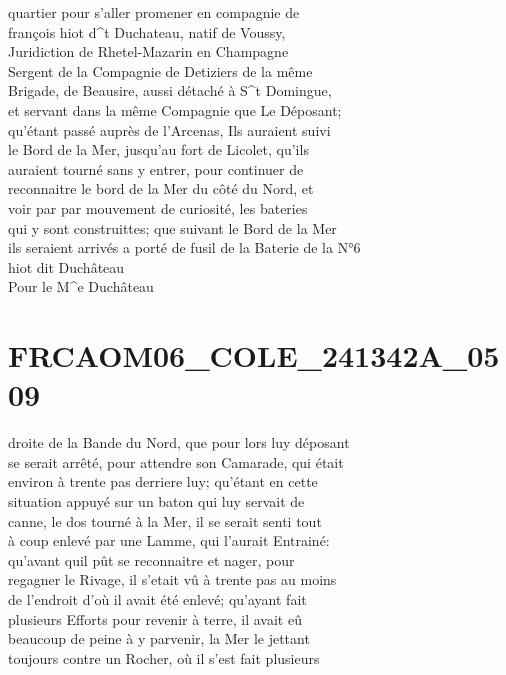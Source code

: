\documentclass{article}
\begin{document}
\begin{pages}
quartier pour s'aller promener en compagnie de\\
françois hiot d\^{}t Duchateau, natif de Voussy,\\
Juridiction de Rhetel-Mazarin en Champagne\\
Sergent de la Compagnie de Detiziers de la même\\
Brigade, de Beausire, aussi détaché à S\^{}t Domingue,\\
et servant dans la même Compagnie que Le Déposant;\\
qu'étant passé auprès de l'Arcenas, Ils auraient suivi\\
le Bord de la Mer, jusqu'au fort de Licolet, qu'ils\\
auraient tourné sans y entrer, pour continuer de\\
reconnaitre le bord de la Mer du côté du Nord, et\\
voir par par mouvement de curiosité, les bateries\\
qui y sont construittes; que suivant le Bord de la Mer\\
ils seraient arrivés a porté de fusil de la Baterie de la
\pend\pstart
N°6\\
hiot dit Duchâteau\\
Pour le M\^{}e Duchâteau
\pend
\endnumbering\beginnumbering\section{FRCAOM06\_COLE\_241342A\_0509}\pstart
droite de la Bande du Nord, que pour lors luy déposant\\
se serait arrêté, pour attendre son Camarade, qui était\\
environ à trente pas derriere luy; qu'étant en cette\\
situation appuyé sur un baton qui luy servait de\\
canne, le dos tourné à la Mer, il se serait senti tout\\
à coup enlevé par une Lamme, qui l'aurait Entrainé:\\
qu'avant quil pût se reconnaitre et nager, pour\\
regagner le Rivage, il s'etait vû à trente pas au moins\\
de l'endroit d'où il avait été enlevé; qu'ayant fait\\
plusieurs Efforts pour revenir à terre, il avait eû\\
beaucoup de peine à y parvenir, la Mer le jettant\\
toujours contre un Rocher, où il s'est fait plusieurs\\

\end{pages}
\end{document}
